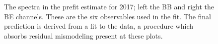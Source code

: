 \begin{figure}[!htbp]{
\caption{The \mgg spectra in the prefit estimate for 2017; left the BB and right the BE channels.
These are the six observables used in the fit.
The final prediction is derived from a fit to the data, a procedure which absorbs residual mismodeling present at these plots.}
\label{fig:Prefit_spectra2017}}
\end{figure}

